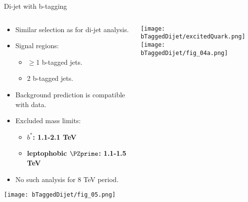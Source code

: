 \documentclass[8pt]{beamer}
\begin{document}
\begin{frame}{\large Di-jet with b-tagging}

\begin{columns}
  \begin{column}{6cm}
    \begin{itemize}
      \item Similar selection as for di-jet analysis. 
      \vspace{0.15cm}
      \item Signal regions:
      \begin{itemize}
       \item $\geq$1 b-tagged jets.
       \item 2 b-tagged jets.
      \end{itemize}
      \vspace{0.15cm}
      \item Background prediction is compatible with data.
      \vspace{0.15cm}
      \item Excluded mass limits: \\
        \begin{itemize}
         \item \textbf{$b^*$: 1.1-2.1 TeV}
         \item \textbf{leptophobic $\PZprime$: 1.1-1.5 TeV}
        \end{itemize}
      \vspace{0.15cm}
      \item No such analysis for 8 TeV period.
    \end{itemize}
    {\centering
      \texttt{[image: bTaggedDijet/fig\_05.png]}\\
    }
  \end{column}
  \begin{column}{6cm}
    {\centering
    \texttt{[image: bTaggedDijet/excitedQuark.png]}\\
    }
    \vspace{0.2cm} 
    \texttt{[image: bTaggedDijet/fig\_04a.png]}\\
  \end{column}
\end{columns}

\end{frame} 
\end{document}
